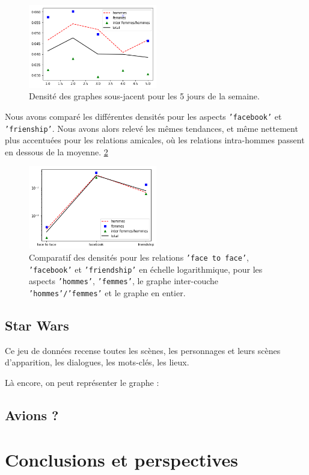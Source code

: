 \documentclass[11pt,a4paper]{article}
\theoremstyle{definition}
\theoremstyle{remark}
\theoremstyle{remark}
\begin{document}
\begin{figure}[H]
	\centering
	\includegraphics[width=0.5\textwidth]{densitesj.png}
	\caption{Densité des graphes sous-jacent pour les 5 jours de la semaine.}
	\label{dsj}
\end{figure}

Nous avons comparé les différentes densités pour les aspects \texttt{'facebook'} et \texttt{'frienship'}. Nous avons alors relevé les mêmes tendances, et même nettement plus accentuées pour les relations amicales, où les relations intra-hommes passent en dessous de la moyenne. \cref{comp}

\begin{figure}[H]
	\centering
	\includegraphics[width=0.5\textwidth]{comparatif.png}
	\caption{Comparatif des densités pour les relations \texttt{'face to face'}, \texttt{'facebook'} et \texttt{'friendship'} en échelle logarithmique, pour les aspects \texttt{'hommes'}, \texttt{'femmes'}, le graphe inter-couche \texttt{'hommes'/'femmes'} et le graphe en entier.}
	\label{comp}
\end{figure}  

\subsection{Star Wars}

Ce jeu de données recense toutes les scènes, les personnages et leurs scènes d'apparition, les dialogues, les mots-clés, les lieux.

Là encore, on peut représenter le graphe : 

\subsection{Avions ?}

\section{Conclusions et perspectives}

    \nocite{*}
    
	
\end{document}
